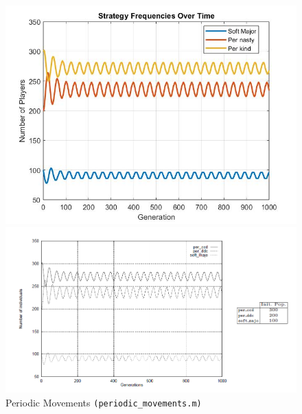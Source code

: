 \begin{figure}[ht!]
	\centering
	\begin{minipage}{0.48\textwidth}
		\includegraphics[width=1\linewidth]{fit_plots_theoretical/Periodic_Movements}
		
		
	\end{minipage}
	\begin{minipage}{0.48\textwidth}
		\includegraphics[width=1\linewidth]{Periodic_Movements}
	\end{minipage}
	\caption{Periodic Movements \texttt{(periodic\_movements.m)}}
\end{figure}

